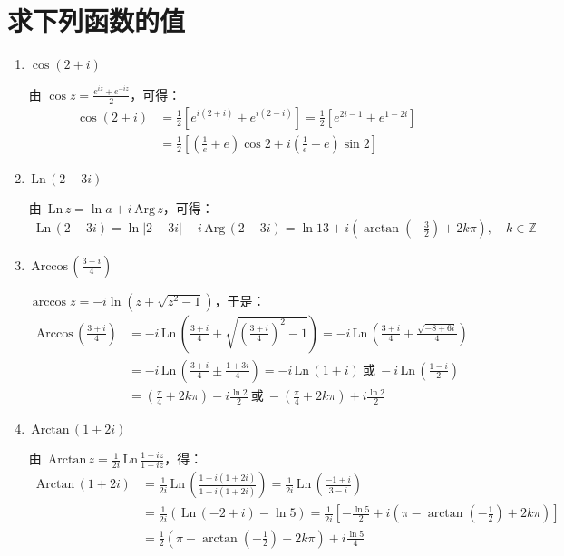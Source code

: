 \documentclass[UTF8]{report}
\def\Ln{\mathrm{\,Ln\,}}
\def\Arg{\mathrm{\,Arg\,}}
\def\Arccos{\mathrm{\,Arccos\,}}
\def\Arctan{\mathrm{\,Arctan\,}}
\theoremstyle{MyLineTheoremStyle} %
\theoremstyle{MyBlockTheoremStyle} %
\theoremstyle{MySubsubsectionStyle} %
\begin{document}
\section{求下列函数的值}
\begin{enumerate}
\item $\cos(2+i)$

由 $\cos z = \frac{e^{iz} + e^{-iz}}{2}$，可得：
\begin{align*}
\cos(2+i) 
&= \frac{1}{2}\left[  e^{i(2+i)} + e^{i(2-i)}  \right] = \frac{1}{2}\left[ e^{2i -1} + e^{1-2i} \right] \\
&= \frac{1}{2}\left[ (\frac{1}{e} + e)\cos 2 + i(\frac{1}{e}-e)\sin 2\right]
\end{align*}

\item $\Ln(2-3i)$

由 $\Ln z = \ln a + i\Arg z$，可得：
\begin{align*}
\Ln (2-3i) = \ln | 2-3i | + i\Arg (2-3i)
= \ln 13 + i\left(\arctan (-\frac{3}{2}) + 2k\pi\right),\quad k \in \mathbb{Z}
\end{align*}

\item $\Arccos (\frac{3+i}{4})$

$\arccos z = -i \ln (z + \sqrt{z^2 -1} )$，于是：
\begin{align*}
\Arccos (\frac{3+i}{4}) 
&= -i \Ln\left(\frac{3+i}{4} + \sqrt{(\frac{3+i}{4})^2 -1} \right) = -i \Ln \left( \frac{3+i}{4} + \frac{\sqrt{-8 + 6i} }{4} \right) \\ 
&= -i \Ln \left( \frac{3+i}{4} \pm \frac{1 + 3i}{4} \right) = -i \Ln(1+i)\  \text{或}\ -i \Ln(\frac{1-i}{2}) \\ 
&= (\frac{\pi}{4} + 2k\pi) - i\frac{\ln 2}{2} \ \text{或}\ -(\frac{\pi}{4} + 2k\pi) + i\frac{\ln 2}{2}
\end{align*}

\item $\Arctan (1+2i)$

由 $\Arctan z = \frac{1}{2i} \Ln \frac{1+iz}{1-iz}$，得：
\begin{align*}
\Arctan (1+2i) 
&= \frac{1}{2i}\Ln \left( \frac{1+i(1+2i)}{1-i(1+2i)} \right)
= \frac{1}{2i}\Ln \left( \frac{-1 + i}{3-i} \right) \\
&= \frac{1}{2i}\left( \Ln (-2+i) - \ln 5 \right) 
= \frac{1}{2i}\left[ -\frac{\ln 5}{2}  + i\left( \pi - \arctan(-\frac{1}{2})  + 2k\pi\right) \right] \\ 
&= \frac{1}{2}\left(\pi - \arctan(-\frac{1}{2})  + 2k\pi\right) + i\frac{\ln 5}{4}
\end{align*}
\end{enumerate}
\end{document}
